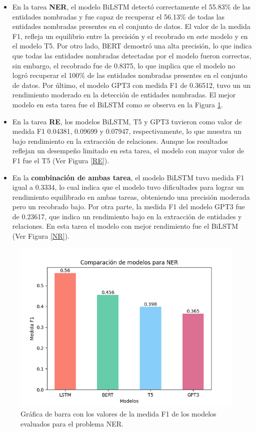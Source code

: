 \documentclass[10pt]{article} %
\begin{document}
	\begin{itemize}
		\item En la tarea \textbf{NER}, el modelo BiLSTM detect\'o correctamente el 55.83\% de las entidades nombradas y fue capaz de recuperar el 56.13\% de todas las entidades nombradas presentes en el conjunto de datos. El valor de la medida F1, refleja un equilibrio entre la precisi\'on y el recobrado en este modelo y en el modelo T5. Por otro lado, BERT demostr\'o una alta precisi\'on, lo que indica que todas las entidades nombradas detectadas por el modelo fueron correctas, sin embargo, el recobrado fue de 0.8375, lo que implica que el modelo no logró recuperar el 100\% de las entidades nombradas presentes en el conjunto de datos. Por \'ultimo, el modelo GPT3 con medida F1 de 0.36512, tuvo un un rendimiento moderado en la detección de entidades nombradas. El mejor modelo en esta tarea fue el BiLSTM como se observa en la Figura \ref{NER}.
		\item En la tarea \textbf{RE}, los modelos BiLSTM, T5 y GPT3 tuvieron como valor de medida F1 0.04381, 0.09699 y 0.07947, respectivamente, lo que muestra un bajo rendimiento en la extracción de relaciones. Aunque los resultados reflejan un desempeño limitado en esta tarea, el modelo con mayor valor de F1 fue el T5 (Ver Figura \ref{RE}).
		\item En la \textbf{combinaci\'on de ambas tarea}, el modelo BiLSTM tuvo medida F1 igual a 0.3334, lo cual indica que el modelo tuvo dificultades para lograr un rendimiento equilibrado en ambas tareas, obteniendo una precisión moderada pero un recobrado bajo. Por otra parte, la medida F1 del modelo GPT3 fue de 0.23617, que indica un rendimiento bajo en la extracción de entidades y relaciones. En esta tarea el modelo con mejor rendimiento fue el BiLSTM (Ver Figura \ref{NR}).
	\end{itemize}
	 
	 	
	\begin{figure}[h]
		\centering
		\includegraphics[scale=0.5]{../images/NER_bar}
		\caption{Gr\'afica de barra con los valores de la medida F1 de los modelos evaluados para el problema NER.}
		\label{NER}
	\end{figure}
\end{document}
